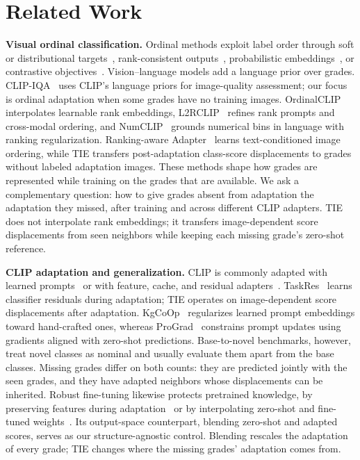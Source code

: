 \section{Related Work}
\label{sec:related}
\label{sec:related_work}

\noindent\textbf{Visual ordinal classification.}
Ordinal methods exploit label order through soft or distributional targets~\cite{diaz2019sord,gao2017dldl}, rank-consistent outputs~\cite{cao2020coral}, probabilistic embeddings~\cite{li2021poe}, or contrastive objectives~\cite{pitawela2025cloc,lee2026conord}.
Vision--language models add a language prior over grades.
CLIP-IQA~\cite{wang2023clipiqa} uses CLIP's language priors for image-quality assessment; our focus is ordinal adaptation when some grades have no training images.
OrdinalCLIP~\cite{li2022ordinalclip} interpolates learnable rank embeddings, L2RCLIP~\cite{wang2023l2rclip} refines rank prompts and cross-modal ordering, and NumCLIP~\cite{du2024numclip} grounds numerical bins in language with ranking regularization.
Ranking-aware Adapter~\cite{yu2025rankingadapter} learns text-conditioned image ordering, while TIE transfers post-adaptation class-score displacements to grades without labeled adaptation images.
These methods shape how grades are represented while training on the grades that are available.
We ask a complementary question: how to give grades absent from adaptation the adaptation they missed, after training and across different CLIP adapters.
TIE does not interpolate rank embeddings; it transfers image-dependent score displacements from seen neighbors while keeping each missing grade's zero-shot reference.

\noindent\textbf{CLIP adaptation and generalization.}
CLIP is commonly adapted with learned prompts~\cite{zhou2022coop,zhou2022cocoop,khattak2023maple} or with feature, cache, and residual adapters~\cite{gao2024clipadapter,zhang2022tipadapter,yu2023taskres}.
TaskRes~\cite{yu2023taskres} learns classifier residuals during adaptation; TIE operates on image-dependent score displacements after adaptation.
KgCoOp~\cite{yao2023kgcoop} regularizes learned prompt embeddings toward hand-crafted ones, whereas ProGrad~\cite{zhu2023prograd} constrains prompt updates using gradients aligned with zero-shot predictions.
Base-to-novel benchmarks, however, treat novel classes as nominal and usually evaluate them apart from the base classes.
Missing grades differ on both counts: they are predicted jointly with the seen grades, and they have adapted neighbors whose displacements can be inherited.
Robust fine-tuning likewise protects pretrained knowledge, by preserving features during adaptation~\cite{kumar2022lpft} or by interpolating zero-shot and fine-tuned weights~\cite{wortsman2022robust}.
Its output-space counterpart, blending zero-shot and adapted scores, serves as our structure-agnostic control.
Blending rescales the adaptation of every grade; TIE changes where the missing grades' adaptation comes from.

